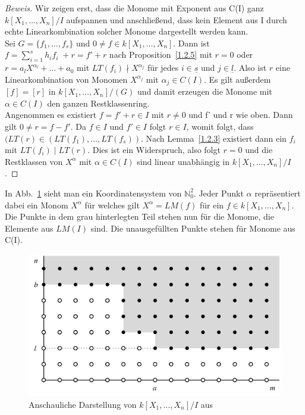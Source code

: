 \documentclass{article}
\newcommand*{\R}{k[X_{1},\ldots,X_{n}]}
\begin{document}
	\begin{proof}[Beweis]
	Wir zeigen erst, dass die Monome mit Exponent aus C(I) ganz \(k[X_{1},\ldots,X_{n}]/I\) 
	aufspannen und anschließend, dass kein Element aus I durch echte Linearkombination solcher
	Monome dargestellt werden kann. \\
	Sei \(G = \{f_{1}, \ldots, f_{s}\}\) und \(0 \neq f \in \R\). Dann ist
	\(f = \sum_{i=1}^{s} h_{i}f_{i}\; + r = f' + r\) nach Proposition~\ref{1.2.5} mit \(r=0\) oder 
	\(r = a_{l}X^{\alpha_{l}} + \ldots + a_{0}\) mit \(LT(f_{i}) \nmid X^{\alpha_{j}}\) 
	für jedes \(i \in \underline{s}\) und \(j \in \underline{l}\). Also ist \(r\) eine
	Linearkombination von Monomen \(X^{\alpha_{j}}\) mit \(\alpha_{j} \in C(I)\).
	Es gilt außerdem \([f] = [r]\) in \(\R/(G)\) und damit erzeugen die
	Monome mit \(\alpha \in C(I)\) den ganzen Restklassenring. \\
	Angenommen es existiert \(f = f' + r \in I\) mit \(r \neq 0\) und f' und r wie oben.
	Dann gilt \(0 \neq r = f - f'\). Da \(f \in I\) und \(f' \in I\) folgt
	\(r \in I\), womit folgt, dass \((LT(r) \in (LT(f_{1}), \ldots, LT(f_{s}))\).
	Nach Lemma~\ref{1.2.3} existiert dann ein \(f_{i}\) mit \(LT(f_{i})\; |\; LT(r)\). Dies ist 
	ein Widerspruch, also folgt \(r = 0\) und die Restklassen von \(X^{\alpha}\) mit
	\(\alpha \in C(I)\) sind linear unabhängig in \(\R/I\).
	\end{proof}
	
	
	In Abb.~\ref{dots} sieht man ein Koordinatensystem von \(\mathbb{N}^{2}_{0}\). Jeder Punkt
	\(\alpha\) repräsentiert dabei ein Monom \(X^{\alpha}\) für welches gilt \(X^{\alpha} = LM(f)\)
	für ein \(f \in \R\). Die Punkte in dem grau hinterlegten Teil stehen nun für die Monome, die
	Elemente aus \(LM(I)\) sind. Die unausgefüllten Punkte stehen für Monome aus C(I).

	\begin{figure}[ht]
		\centering
		\includegraphics[width=.75\linewidth]{Dots.png}
		\caption{Anschauliche Darstellung von \(\R/I\) aus \cite{CLOS}}
		\label{dots}
	\end{figure}
\end{document}
